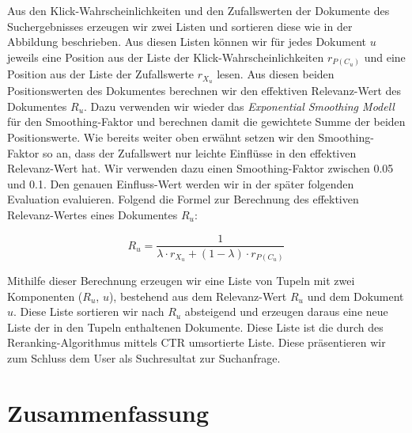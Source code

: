 Aus den Klick-Wahrscheinlichkeiten und den Zufallswerten der Dokumente des Suchergebnisses erzeugen wir zwei Listen und sortieren diese wie in der Abbildung beschrieben. Aus diesen Listen können wir für jedes Dokument $u$ jeweils eine Position aus der Liste der Klick-Wahrscheinlichkeiten $r_{P(C_{u})}$ und eine Position aus der Liste der Zufallswerte $r_{X_{u}}$ lesen. Aus diesen beiden Positionswerten des Dokumentes berechnen wir den effektiven Relevanz-Wert des Dokumentes $R_{u}$. Dazu verwenden wir wieder das \textit{Exponential Smoothing Modell} für den Smoothing-Faktor und berechnen damit die gewichtete Summe der beiden Positionswerte. Wie bereits weiter oben erwähnt setzen wir den Smoothing-Faktor so an, dass der Zufallswert nur leichte Einflüsse in den effektiven Relevanz-Wert hat. Wir verwenden dazu einen Smoothing-Faktor zwischen 0.05 und 0.1. Den genauen Einfluss-Wert werden wir in der später folgenden Evaluation evaluieren. Folgend die Formel zur Berechnung des effektiven Relevanz-Wertes eines Dokumentes $R_{u}$:

\begin{equation}
	R_{u} = \frac{1}{\lambda\cdot r_{X_{u}} + (1 - \lambda)\cdot r_{P(C_{u})}}
\end{equation}

Mithilfe dieser Berechnung erzeugen wir eine Liste von Tupeln mit zwei Komponenten ($R_{u}$, $u$), bestehend aus dem Relevanz-Wert $R_{u}$ und dem Dokument $u$. Diese Liste sortieren wir nach $R_{u}$ absteigend und erzeugen daraus eine neue Liste der in den Tupeln enthaltenen Dokumente. Diese Liste ist die durch des Reranking-Algorithmus mittels CTR umsortierte Liste. Diese präsentieren wir zum Schluss dem User als Suchresultat zur Suchanfrage. 


\section{Zusammenfassung}
\label{sec:Reranking:Zusammenfassung}

